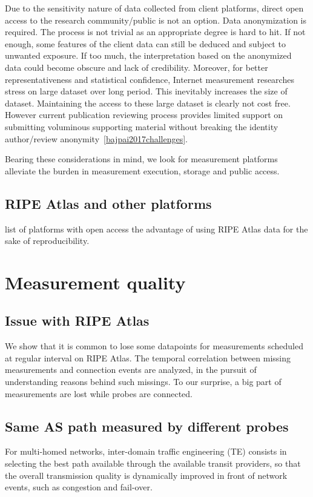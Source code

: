 Due to the sensitivity nature of data collected from client platforms, direct open access to the research community/public is not an option. Data anonymization is required. The process is not trivial as an appropriate degree is hard to hit. If not enough, some features of the client data can still be deduced and subject to unwanted exposure. If too much, the interpretation based on the anonymized data could become obscure and lack of credibility. Moreover, for better representativeness and statistical confidence, Internet measurement researches stress on large dataset over long period. This inevitably increases the size of dataset. Maintaining the access to these large dataset is clearly not cost free. However current publication reviewing process provides limited support on submitting voluminous supporting material without breaking the identity author/review anonymity~\ref{bajpai2017challenges}.

Bearing these considerations in mind, we look for measurement platforms alleviate the burden in measurement execution, storage and public access.

\subsection{RIPE Atlas and other platforms}
list of platforms with open access
the advantage of using RIPE Atlas data for the sake of reproducibility.

\section{Measurement quality}
\subsection{Issue with RIPE Atlas}
We show that it is common to lose some datapoints for measurements scheduled at regular interval on RIPE Atlas. 
The temporal correlation between missing measurements and connection events are %
analyzed, in the pursuit of understanding reasons behind such missings.
To our surprise, a big part of measurements are lost while probes are connected.

\subsection{Same AS path measured by different probes}
For multi-homed networks, inter-domain traffic engineering (TE) 
consists in selecting the best path available through the available transit providers,
so that the overall transmission quality is dynamically improved in front of network events, such as congestion and fail-over. 


